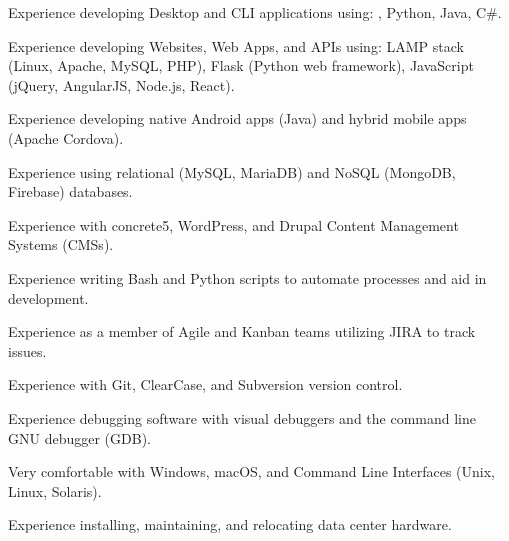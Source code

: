 \begin{itemize*}
  \item Experience developing Desktop and CLI applications using: \CPP, Python, Java, C\#.
  \item Experience developing Websites, Web Apps, and APIs using: LAMP stack (Linux, Apache, MySQL, PHP), Flask (Python web framework), JavaScript (jQuery, AngularJS, Node.js, React).
  \item Experience developing native Android apps (Java) and hybrid mobile apps (Apache Cordova).
  \item Experience using relational (MySQL, MariaDB) and NoSQL (MongoDB, Firebase) databases.
  \item Experience with concrete5, WordPress, and Drupal Content Management Systems (CMSs).
  \item Experience writing Bash and Python scripts to automate processes and aid in development.
  \item Experience as a member of Agile and Kanban teams utilizing JIRA to track issues.
  \item Experience with Git, ClearCase, and Subversion version control.
  \item Experience debugging software with visual debuggers and the command line GNU debugger (GDB).
  \item Very comfortable with Windows, macOS, and Command Line Interfaces (Unix, Linux, Solaris).
  \item Experience installing, maintaining, and relocating data center hardware.
\end{itemize*}


